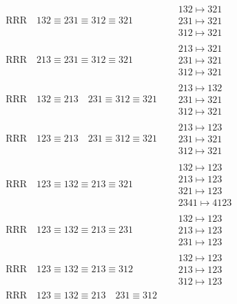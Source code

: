 \documentclass{article}
\begin{document}
\begin{align}
\text{RRR}
\quad
132\equiv231\equiv312\equiv321
\quad
&
\begin{matrix}
132 \mapsto 321
\\
231 \mapsto 321
\\
312 \mapsto 321
\end{matrix}
\\
\text{RRR}
\quad
213\equiv231\equiv312\equiv321
\quad
&
\begin{matrix}
213 \mapsto 321
\\
231 \mapsto 321
\\
312 \mapsto 321
\end{matrix}
\\
\text{RRR}
\quad
132\equiv213
\quad
231\equiv312\equiv321
\quad
&
\begin{matrix}
213 \mapsto 132
\\
231 \mapsto 321
\\
312 \mapsto 321
\end{matrix}
\\
\text{RRR}
\quad
123\equiv213
\quad
231\equiv312\equiv321
\quad
&
\begin{matrix}
213 \mapsto 123
\\
231 \mapsto 321
\\
312 \mapsto 321
\end{matrix}
\\
\text{RRR}
\quad
123\equiv132\equiv213\equiv321
\quad
&
\begin{matrix}
132 \mapsto 123
\\
213 \mapsto 123
\\
321 \mapsto 123
\\
2341 \mapsto 4123
\end{matrix}
\\
\text{RRR}
\quad
123\equiv132\equiv213\equiv231
\quad
&
\begin{matrix}
132 \mapsto 123
\\
213 \mapsto 123
\\
231 \mapsto 123
\end{matrix}
\\
\text{RRR}
\quad
123\equiv132\equiv213\equiv312
\quad
&
\begin{matrix}
132 \mapsto 123
\\
213 \mapsto 123
\\
312 \mapsto 123
\end{matrix}
\\
\text{RRR}
\quad
123\equiv132\equiv213
\quad
231\equiv312
\quad
&
\begin{matrix}

\end{matrix}
\end{align}
\end{document}
